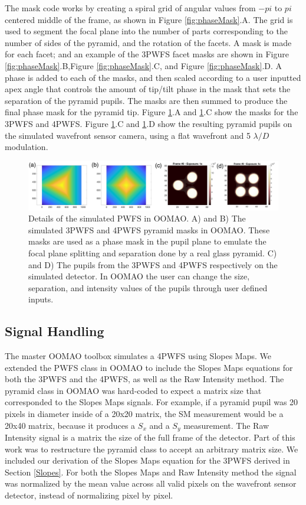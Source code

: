  The mask code works by creating a spiral grid of angular values from $-pi$ to $pi$ centered middle of the frame, as shown in Figure \ref{fig:phaseMask}.A. The grid is used to segment the focal plane into the number of parts corresponding to the number of sides of the pyramid, and the rotation of the facets. A mask is made for each facet; and an example of the 3PWFS facet masks are shown in Figure \ref{fig:phaseMask}.B,Figure \ref{fig:phaseMask}.C, and Figure \ref{fig:phaseMask}.D. A phase is added to each of the masks, and then scaled according to a user inputted apex angle that controls the amount of tip/tilt phase in the mask that sets the separation of the pyramid pupils. The masks are then summed to produce the final phase mask for the pyramid tip. Figure \ref{fig:oomaoFigs}.A and \ref{fig:oomaoFigs}.C show the masks for the 3PWFS and 4PWFS. Figure \ref{fig:oomaoFigs}.C and \ref{fig:oomaoFigs}.D show the resulting pyramid pupils on the simulated wavefront sensor camera, using a flat wavefront and 5 $\lambda/D$ modulation. 

\begin{figure}
    \centering
    \includegraphics[width=1\textwidth]{Chapter Materials/Chapter Four Materials/oomaoFigs.png}
    \caption{Details of the simulated PWFS in OOMAO. A) and B) The simulated 3PWFS and 4PWFS pyramid masks in OOMAO. These masks are used as a phase mask in the pupil plane to emulate the focal plane splitting and separation done by a real glass pyramid. C) and D) The pupils from the 3PWFS and 4PWFS respectively on the simulated detector. In OOMAO the user can change the size, separation, and intensity values of the pupils through user defined inputs.}
    \label{fig:oomaoFigs}
\end{figure}

\subsection{Signal Handling}

The master OOMAO toolbox simulates a 4PWFS using Slopes Maps. We extended the PWFS class in OOMAO to include the Slopes Maps equations for both the 3PWFS and the 4PWFS, as well as the Raw Intensity method. The pyramid class in OOMAO was hard-coded to expect a matrix size that corresponded to the Slopes Maps signals. For example, if a pyramid pupil was 20 pixels in diameter inside of a 20x20 matrix, the SM measurement would be a 20x40 matrix, because it produces a $S_x$ and  a $S_y$ measurement. The Raw Intensity signal is a matrix the size of the full frame of the detector. Part of this work was to restructure the pyramid class to accept an arbitrary matrix size.  We included our derivation of the Slopes Maps equation for the 3PWFS derived in Section \ref{Slopes}. For both the Slopes Maps and Raw Intensity method the signal was normalized by the mean value across all valid pixels on the wavefront sensor detector, instead of normalizing pixel by pixel. 

